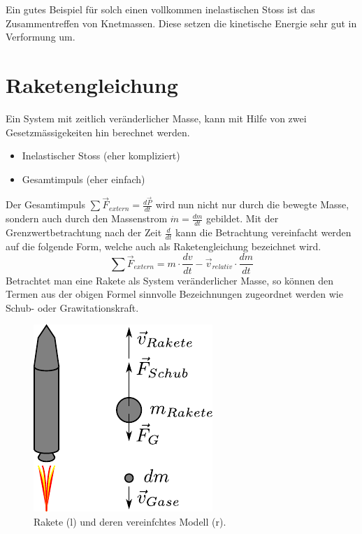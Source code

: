 \noindent
Ein gutes Beispiel für solch einen vollkommen inelastischen Stoss ist
das Zusammentreffen von Knetmassen. Diese setzen die kinetische Energie
sehr gut in Verformung um.

\section{Raketengleichung}\label{sec:raketengleichung}
Ein System mit zeitlich veränderlicher Masse, kann mit Hilfe von zwei
Gesetzmässigekeiten hin berechnet werden.
\begin{itemize}
	\item Inelastischer Stoss (eher kompliziert)
	\item Gesamtimpuls (eher einfach)
\end{itemize}
Der Gesamtimpuls $\sum \vec{F}_{extern} = \frac{d\vec{P}}{dt}$ wird nun
nicht nur durch die bewegte Masse, sondern auch durch den Massenstrom 
$\dot{m}=\frac{dm}{dt}$ gebildet. 
Mit der Grenzwertbetrachtung nach der Zeit $\frac{d}{dt}$ kann die
Betrachtung vereinfacht werden auf die folgende Form, welche auch
als Raketengleichung bezeichnet wird.
\[  \boxed{
	\sum \vec{F}_{extern} 
		= m \cdot \frac{dv}{dt} 
		- \vec{v}_{relativ} \cdot \frac{dm}{dt}
	} \]
Betrachtet man eine Rakete als System veränderlicher Masse, so können 
den Termen aus der obigen Formel sinnvolle Bezeichnungen zugeordnet 
werden wie Schub- oder Grawitationskraft.
\begin{figure}[h!]
	\centering
	\includegraphics[scale=0.8]{rakete.pdf}
	\caption{Rakete (l) und deren vereinfchtes Modell (r).}
	\label{fig:rakete}
\end{figure}

